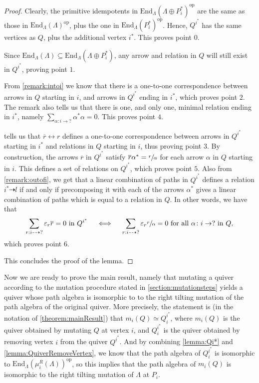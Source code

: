 \documentclass[12pt, dvipsnames, oneside]{amsart}
\theoremstyle{definition}
\newcommand{\End}{\text{End}}
\begin{document}
\begin{proof}
Clearly, the primitive idempotents in $\End_\Lambda(\Lambda\oplus P_i^*)^{\text{op}}$ are the same as those in $\End_\Lambda(\Lambda)^{\text{op}}$, plus the one in $\End_\Lambda(P_i^*)^{\text{op}}$. Hence, $Q^{i^*}$ has the same vertices as $Q$, plus the additional vertex $i^*$. This proves point $0$.

Since $\End_\Lambda(\Lambda)\subseteq \End_\Lambda(\Lambda\oplus P_i^*)$, any arrow and relation in $Q$ will still exist in $Q^{i^*}$, proving point $1$.

From \cref{remark:intoi} we know that there is a one-to-one correspondence between arrows in $Q$ starting in $i$, and arrows in $Q^{i^*}$ ending in $i^*$, which proves point $2$. The remark also tells us that there is one, and only one, minimal relation ending in $i^*$, namely $\sum\limits_{\alpha:i\rightarrow ?}\alpha^*\alpha=0$. This proves point $4$. 

 tells us that $\overline{r} \leftrightarrow r$ defines a one-to-one correspondence between arrows in $Q^{i^*}$ starting in $i^*$ and relations in $Q$ starting in $i$, thus proving point $3$. 
By construction, the arrows $\overline{r}$ in $Q^{i^*}$ satisfy $\overline{r}\alpha^*=\sfrac{r}{\alpha}$ for each arrow $\alpha$ in $Q$ starting in $i$. This defines a set of relations on $Q^{i^*}$, which proves point $5$.
Also from \cref{remark:outofi}, we get that a linear combination of paths in $Q^{i^*}$ defines a relation $i^*\dashrightarrow l$ if and only if precomposing it with each of the arrows $\alpha^*$ gives a linear combination of paths which is equal to a relation in $Q$. In other words, we have that
$$\sum\limits_{r:i\dashrightarrow ?} \varepsilon_r \overline{r}=0 \text{ in } Q^{i^*} \quad \iff \quad \sum\limits_{r:i\dashrightarrow ?} \varepsilon_r \sfrac{r}{\alpha}=0 \text{ for all } \alpha\colon i\rightarrow ? \text{ in } Q,$$
which proves point $6$.

This concludes the proof of the lemma.

\end{proof}

Now we are ready to prove the main result, namely that mutating a quiver according to the mutation procedure stated in \cref{section:mutationsteps} yields a quiver whose path algebra is isomorphic to to the right tilting mutation of the path algebra of the original quiver.
More precisely, the statement is (in the notation of \cref{theorem:mainResult}) that $m_i(Q)\simeq Q_i^{{i^*}}$, where $m_i(Q)$ is the quiver obtained by mutating $Q$ at vertex $i$, and $Q_i^{i^*}$ is the quiver obtained by removing vertex $i$ from the quiver $Q^{i^*}$. 
And by combining \cref{lemma:Qi*} and \cref{lemma:QuiverRemoveVertex}, we know that the path algebra of $Q_i^{i^*}$ is isomorphic to $\End_\Lambda(\mu_i^R(\Lambda))^{\text{op}}$, so this implies that the path algebra of $m_i(Q)$ is isomorphic to the right tilting mutation of $\Lambda$ at $P_i$.
\end{document}
